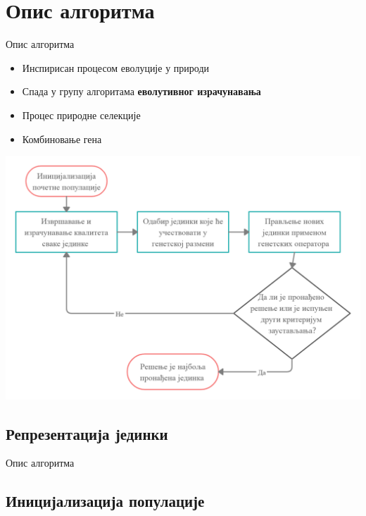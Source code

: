 \documentclass{beamer}
\begin{document}
\section{Опис алгоритма}

    \begin{frame}{Опис алгоритма}
        \begin{itemize}
            \item Инспирисан процесом еволуције у природи
            \item Спада у групу алгоритама \textbf{еволутивног  израчунавања}	
            \item Процес природне селекције
            \item Комбиновање гена
        \end{itemize}
        \begin{center}
            \includegraphics[scale=0.14]{opsti_algoritam.png}
        \end{center}
    \end{frame}
    
    \subsection[Репрезентација јединки]{Репрезентација јединки}

    \begin{frame}{Опис алгоритма}
    \end{frame}
    
    \subsection[Иницијализација популације]{Иницијализација популације}
\end{document}
